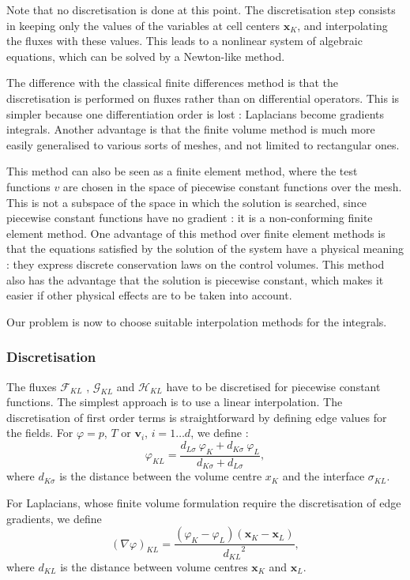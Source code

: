 \documentclass[12pt]{article}
\newcommand{\vb}[1]{\ensuremath{\boldsymbol #1}}
\begin{document}
Note that no discretisation is done at this point. The discretisation
step consists in keeping only the values of the variables at cell
centers $\vb{x}_K$, and interpolating the fluxes with these
values. This leads to a nonlinear system of algebraic equations, which
can be solved by a Newton-like method.

The difference with the classical finite differences method is that
the discretisation is performed on fluxes rather than on differential
operators. This is simpler because one differentiation order is lost :
Laplacians become gradients integrals. Another advantage is that the
finite volume method is much more easily generalised to various sorts
of meshes, and not limited to rectangular ones.

This method can also be seen as a finite element method, where the
test functions $v$ are chosen in the space of piecewise constant
functions over the mesh. This is not a subspace of the space in which
the solution is searched, since piecewise constant functions have no
gradient : it is a non-conforming finite element method. One advantage
of this method over finite element methods is that the equations
satisfied by the solution of the system have a physical meaning : they
express discrete conservation laws on the control volumes. This method
also has the advantage that the solution is piecewise constant, which
makes it easier if other physical effects are to be taken into
account.

Our problem is now to choose suitable interpolation methods for the
integrals.
\subsubsection{Discretisation}
The fluxes $\mathcal F_{KL}$ , $\mathcal G_{KL}$ and $\mathcal H_{KL}$
have to be discretised for piecewise constant functions. The simplest
approach is to use a linear interpolation. The discretisation of first
order terms is straightforward by defining edge values for the
fields. For $\varphi = p$, $T$ or $\vb{v_{i}}$, $i = 1 \dots d$, we
define :  $$\varphi_{KL} = \frac{d_{L\sigma} \ \varphi_{K} +
  d_{K\sigma} \ \varphi_{L}}{d_{K\sigma} + d_{L\sigma}},$$ where $d_{K
  \sigma}$ is the distance between the volume centre $x_{K}$ and the
interface $\sigma_{KL}$.

For Laplacians, whose finite volume formulation require the
discretisation of edge gradients, we define $$(\nabla \varphi)_{KL} =
\frac{(\varphi_{K} - \varphi_{L}) (\vb{x}_{K} - \vb{x_{L}})}
{{d_{KL}}^{2}},$$ where $d_{KL}$ is the distance between volume
centres $\vb{x}_{K}$ and $\vb{x}_{L}$.
\end{document}
